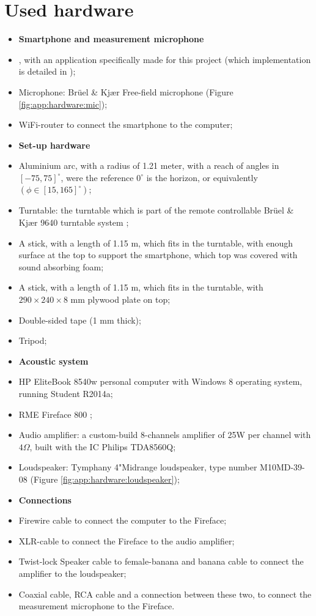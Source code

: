 \section{Used hardware}
\begin{itemize}
\item[]\textbf{Smartphone and measurement microphone}
\item \nexus, with an application specifically made for this project (which implementation is detailed in \cite{BAP:RoySjoerd});
\item Microphone: Br\"uel \& Kj\ae r Free-field microphone \cite{manual:microphone} (Figure \ref{fig:app:hardware:mic});
\item WiFi-router to connect the smartphone to the computer;
\item[]\textbf{Set-up hardware}
\item Aluminium arc, with a radius of 1.21 meter, with a reach of angles in $[-75,75]^\circ$, were the reference $0^\circ$ is the horizon, or equivalently $(\phi\in[15,165]^\circ)$;
\item Turntable: the turntable which is part of the remote controllable Br\"uel \& Kj\ae r 9640 turntable system \cite{manual:turntable};
\item A stick, with a length of 1.15 m, which fits in the turntable, with enough surface at the top to support the smartphone, which top was covered with sound absorbing foam;
\item A stick, with a length of 1.15 m, which fits in the turntable, with $290\times240\times8$ mm plywood plate on top;
\item Double-sided tape (1 mm thick);
\item Tripod;
\item[]\textbf{Acoustic system}
\item HP EliteBook 8540w personal computer with Windows 8 operating system, running \matlab Student R2014a;
\item RME Fireface 800 \cite{manual:fireface};
\item Audio amplifier: a custom-build 8-channels amplifier of 25W per channel with $4\Omega$, built with the IC Philips TDA8560Q;
\item Loudspeaker: Tymphany 4"Midrange loudspeaker, type number M10MD-39-08 \cite{manual:loudspeaker} (Figure \ref{fig:app:hardware:loudspeaker});
\item[]\textbf{Connections}
\item Firewire cable to connect the computer to the Fireface;
\item XLR-cable to connect the Fireface to the audio amplifier;
\item Twist-lock Speaker cable to female-banana and banana cable to connect the amplifier to the loudspeaker;
\item Coaxial cable, RCA cable and a connection between these two, to connect the measurement microphone to the Fireface.
\end{itemize}

